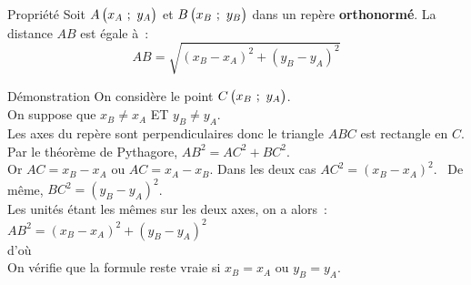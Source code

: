 \documentclass[
    a4paper,
    12pt,
    mathserif,
    handout
    ]{beamer}
\begin{document}
\begin{frame}
	\begin{block}{Propriété}
	Soit $A\begin{pmatrix}x_A~;~y_A\end{pmatrix}$ et $B\begin{pmatrix}x_B~;~y_B\end{pmatrix}$ dans un repère \textbf{orthonormé}. La distance $AB$ est égale à~: $$AB=\sqrt{\left(x_B-x_A\right)^2+\left(y_B-y_A\right)^2}$$
	
	\end{block}
\end{frame}

\begin{frame}
	\begin{alertblock}{Démonstration}
	On considère le point $C\begin{pmatrix}x_B~;~y_A\end{pmatrix}$.\\\pause
	On suppose que $x_B \neq x_A$ ET $y_B \neq y_A$.\\\pause
	Les axes du repère sont perpendiculaires donc le triangle $ABC$ est rectangle en $C$.\\\pause
	Par le théorème de Pythagore, $AB^2=AC^2+BC^2$.\\\pause
	Or $AC=x_B-x_A$ ou $AC=x_A-x_B$. Dans les deux cas $AC^2=\left(x_B-x_A\right)^2$.\pause ~ De même, $BC^2=\left(y_B-y_A\right)^2$.\\\pause
	Les unités étant les mêmes sur les deux axes, on a alors~: $AB^2=\left(x_B-x_A\right)^2+\left(y_B-y_A\right)^2$\\\pause
	d'où \\\pause
	On vérifie que la formule reste vraie si $x_B=x_A$ ou $y_B=y_A$.
	\end{alertblock}
\end{frame}
\end{document}
